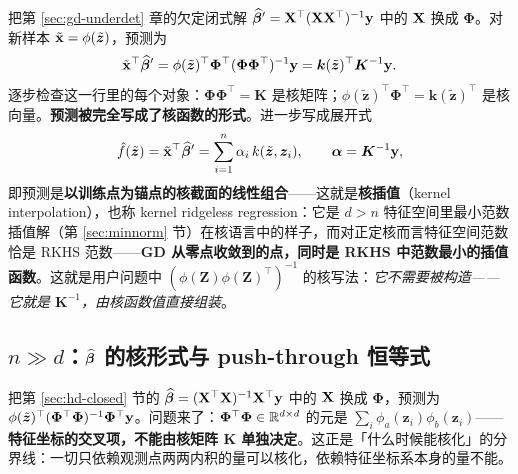 把第 \ref{sec:gd-underdet} 章的欠定闭式解 $\widehat{\bm{\beta}}' = \mathbf{X}^\top(\mathbf{X}\mathbf{X}^\top)^{-1}\mathbf{y}$ 中的 $\mathbf{X}$ 换成 $\bm{\Phi}$。对新样本 $\tilde{\mathbf{x}} = \phi(\tilde{\bm{z}})$，预测为
\begin{equation}\label{eq:kernel-interp}
  \tilde{\mathbf{x}}^\top \widehat{\bm{\beta}}'
  = \phi(\tilde{\bm{z}})^\top \bm{\Phi}^\top (\bm{\Phi}\bm{\Phi}^\top)^{-1} \mathbf{y}
  = \bm{k}(\tilde{\bm{z}})^\top \bm{K}^{-1} \mathbf{y} .
\end{equation}
逐步检查这一行里的每个对象：$\bm{\Phi}\bm{\Phi}^\top = \bm{K}$ 是核矩阵；$\phi(\tilde{\bm{z}})^\top \bm{\Phi}^\top = \bm{k}(\tilde{\bm{z}})^\top$ 是核向量。\textbf{预测被完全写成了核函数的形式}。进一步写成展开式
\begin{equation}\label{eq:kernel-expansion}
  \hat{f}(\tilde{\bm{z}}) = \tilde{\mathbf{x}}^\top \widehat{\bm{\beta}}' = \sum_{i=1}^n \alpha_i\, k(\tilde{\bm{z}}, \bm{z}_i),
  \qquad
  \bm{\alpha} = \bm{K}^{-1} \mathbf{y} ,
\end{equation}
即预测是\textbf{以训练点为锚点的核截面的线性组合}——这就是\textbf{核插值}（kernel interpolation），也称 kernel ridgeless regression：它是 $d > n$ 特征空间里最小范数插值解（第 \ref{sec:minnorm} 节）在核语言中的样子，而对正定核而言特征空间范数恰是 RKHS 范数——\textbf{GD 从零点收敛到的点，同时是 RKHS 中范数最小的插值函数}\cite{kimeldorf1970}。这就是用户问题中 $(\phi(\bm{Z})\phi(\bm{Z})^\top)^{-1}$ 的核写法：\textit{它不需要被构造——它就是 $\bm{K}^{-1}$，由核函数值直接组装}。

\subsection[$n \gg d$：OLS 闭式解的核形式]{$n \gg d$：$\widehat{\bm{\beta}}$ 的核形式与 push-through 恒等式}\label{sec:kernel-overdet}

把第 \ref{sec:hd-closed} 节的 $\widehat{\bm{\beta}} = (\mathbf{X}^\top\mathbf{X})^{-1}\mathbf{X}^\top\mathbf{y}$ 中的 $\mathbf{X}$ 换成 $\bm{\Phi}$，预测为 $\phi(\tilde{\bm{z}})^\top (\bm{\Phi}^\top\bm{\Phi})^{-1} \bm{\Phi}^\top \mathbf{y}$。问题来了：$\bm{\Phi}^\top\bm{\Phi} \in \mathbb{R}^{d \times d}$ 的元是 $\sum_i \phi_a(\bm{z}_i)\phi_b(\bm{z}_i)$——\textbf{特征坐标的交叉项，不能由核矩阵 $\bm{K}$ 单独决定}。这正是「什么时候能核化」的分界线：一切只依赖观测点两两内积的量可以核化，依赖特征坐标系本身的量不能。

